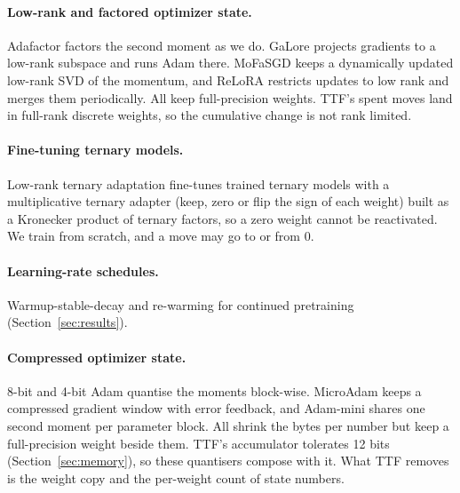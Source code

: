\documentclass[10pt,twocolumn]{article}
\begin{document}
\paragraph{Low-rank and factored optimizer state.} Adafactor \citep{shazeer2018adafactor} factors the second moment as
we do. GaLore \citep{zhao2024galore} projects gradients to a low-rank subspace and runs Adam there. MoFaSGD
\citep{mahdavinia2025mofasgd} keeps a dynamically updated low-rank SVD of the momentum, and ReLoRA
\citep{lialin2023relora} restricts updates to low rank and merges them periodically. All keep full-precision weights.
TTF's spent moves land in full-rank discrete weights, so the cumulative change is not rank limited.

\paragraph{Fine-tuning ternary models.} Low-rank ternary adaptation \citep{manolache2026ternary} fine-tunes trained
ternary models with a multiplicative ternary adapter (keep, zero or flip the sign of each weight) built as a Kronecker
product of ternary factors, so a zero weight cannot be reactivated. We train from scratch, and a move may go to or from 0.

\paragraph{Learning-rate schedules.} Warmup-stable-decay \citep{hu2024minicpm,hagele2024scaling} and re-warming for
continued pretraining \citep{gupta2023continual,ibrahim2024simple} (Section~\ref{sec:results}).

\paragraph{Compressed optimizer state.} 8-bit \citep{dettmers2022optimizers} and 4-bit \citep{li2023memory} Adam
quantise the moments block-wise. MicroAdam \citep{modoranu2024microadam} keeps a compressed gradient window with error
feedback, and Adam-mini \citep{zhang2025adammini} shares one second moment per parameter block. All shrink the bytes per
number but keep a full-precision weight beside them. TTF's accumulator tolerates 12 bits (Section~\ref{sec:memory}), so
these quantisers compose with it. What TTF removes is the weight copy and the per-weight count of state numbers.
\end{document}

